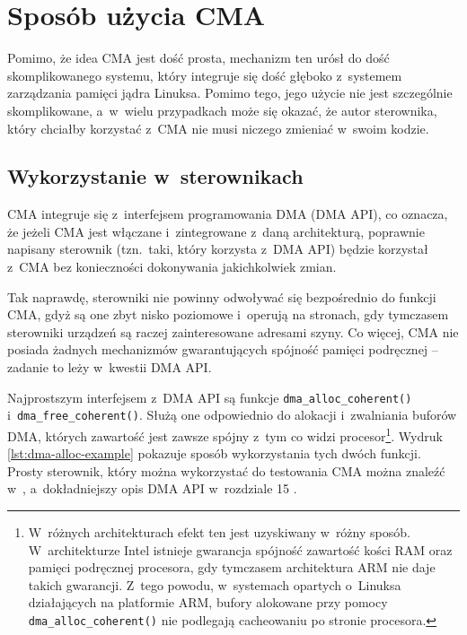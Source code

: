 \chapter{Sposób użycia CMA}\label{sec:cma-usage}

Pomimo, że idea CMA jest dość prosta, mechanizm ten urósł do dość
skomplikowanego systemu, który integruje się dość głęboko z~systemem
zarządzania pamięci jądra Linuksa.  Pomimo tego, jego użycie nie jest
szczególnie skomplikowane, a~w~wielu przypadkach może się okazać, że
autor sterownika, który chciałby korzystać z~CMA nie musi niczego
zmieniać w~swoim kodzie.

\section{Wykorzystanie w~sterownikach}\label{sec:usage-drivers}

CMA integruje się z~interfejsem programowania DMA (DMA API), co
oznacza, że jeżeli CMA jest włączane i~zintegrowane z~daną
architekturą, poprawnie napisany sterownik (tzn.\ taki, który korzysta
z~DMA API) będzie korzystał z~CMA bez konieczności dokonywania
jakichkolwiek zmian.

Tak naprawdę, sterowniki nie powinny odwoływać się bezpośrednio do
funkcji CMA, gdyż są one zbyt nisko poziomowe i~operują na stronach,
gdy tymczasem sterowniki urządzeń są raczej zainteresowane adresami
szyny.  Co więcej, CMA nie posiada żadnych mechanizmów gwarantujących
spójność pamięci podręcznej -- zadanie to leży w~kwestii DMA API.

Najprostszym interfejsem z~DMA API są funkcje
\lstinline|dma_alloc_coherent()| i~\lstinline|dma_free_coherent()|.
Służą one odpowiednio do alokacji i~zwalniania buforów DMA, których
zawartość jest zawsze spójny z~tym co widzi
procesor\footnote{W~różnych architekturach efekt ten jest uzyskiwany
  w~różny sposób.  W~architekturze Intel istnieje gwarancja spójność
  zawartość kości RAM oraz pamięci podręcznej procesora, gdy tymczasem
  architektura ARM nie daje takich gwarancji.  Z~tego powodu,
  w~systemach opartych o~Linuksa działających na platformie ARM,
  bufory alokowane przy pomocy \lstinline|dma_alloc_coherent()| nie
  podlegają cacheowaniu po stronie procesora.}. Wydruk
\ref{lst:dma-alloc-example} pokazuje sposób wykorzystania tych
dwóch funkcji.  Prosty sterownik, który można wykorzystać do
testowania CMA można znaleźć w~\cite{patch:cma-test}, a~dokładniejszy
opis DMA API w~rozdziale 15 \cite{bib:ldd3}.

